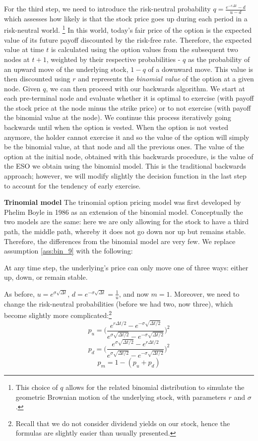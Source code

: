 For the third step, we need to introduce the risk-neutral probability $q = \frac{e^{-r \Delta t} - d}{u-d}$ which assesses how likely is that the stock price goes up during each period in a risk-neutral world. \footnote{This choice of $q$ allows for the related binomial distribution to simulate the geometric Brownian motion of the underlying stock, with parameters $r$ and $\sigma$.} In this world, today's fair price of the option is the expected value of its future payoff discounted by the risk-free rate. Therefore, the expected value at time $t$ is calculated using the option values from the subsequent two nodes at $t+1$, weighted by their respective probabilities - $q$ as the probability of an upward move of the underlying stock, $1-q$ of a downward move. This value is then discounted using $r$ and represents the \textit{binomial value} of the option at a given node. 
Given $q$, we can then proceed with our backwards algorithm. We start at each pre-terminal node and evaluate whether it is optimal to exercise (with payoff the stock price at the node minus the strike price) or to not exercise (with payoff the binomial value at the node). We continue this process iteratively going backwards until when the option is vested. When the option is not vested anymore, the holder cannot exercise it and so the value of the option will simply be the binomial value, at that node and all the previous ones.
The value of the option at the initial node, obtained with this backwards procedure, is the value of the ESO we obtain using the binomial model.
This is the traditional backwards approach; however, we will modify slightly the decision function in the last step to account for the tendency of early exercise.

\textbf{Trinomial model}
The trinomial option pricing model was  first developed by Phelim Boyle in 1986 as an extension of the binomial model. Conceptually the two models are the same: here we are only allowing for the stock to have a third path, the middle path, whereby it does not go down nor up but remains stable. Therefore, the differences from the binomial model are very few. We replace assumption \ref*{ass:bin_9} with the following:
\begin{assumption}
    \label{ass:trin_10}
    At any time step, the underlying's price can only move one of three ways: either up, down, or remain stable.
\end{assumption}
As before, $u = e^{\sigma \sqrt{\Delta t}}$, $d = e^{-\sigma \sqrt{\Delta t}}=\frac{1}{u}$, and now $m=1$. Moreover, we need to change the risk-neutral probabilities (before we had two, now three), which become slightly more complicated:\footnote{Recall that we do not consider dividend yields on our stock, hence the formulas are slightly easier than usually presented.}
$$ p_u = \Biggl(\frac{e^{r \Delta t / 2} - e^{-\sigma \sqrt{\Delta t / 2}}}{e^{\sigma \sqrt{\Delta t / 2}} - e^{-\sigma \sqrt{\Delta t / 2}}}\Biggr)^2 $$
$$ p_d = \Biggl(\frac{e^{\sigma \sqrt{\Delta t / 2}} - e^{r \Delta t / 2}}{e^{\sigma \sqrt{\Delta t / 2}} - e^{-\sigma \sqrt{\Delta t / 2}}}\Biggr)^2 $$
$$ p_m = 1 - (p_u + p_d) $$

